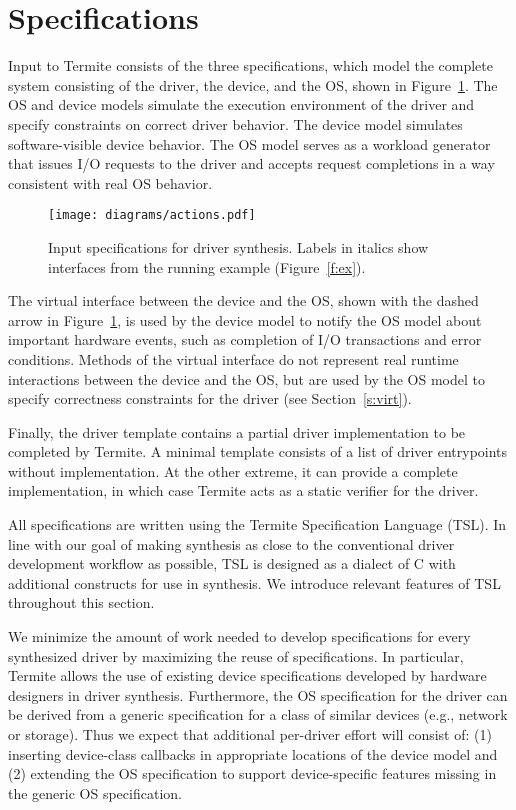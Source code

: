 \documentclass{book}
\newcommand{\termite}{Termite\xspace}
\newcommand{\tsl}{TSL\xspace}
\theoremstyle{definition}
\begin{document}
\section{Specifications}

\label{s:specifications}

Input to \termite consists of the three specifications, which model the complete system consisting of the driver, the device, and the OS, shown in Figure~\ref{f:actions}.  The OS and device models simulate the execution environment of the driver and specify constraints on correct driver behavior.  The device model simulates software-visible device behavior.  The OS model serves as a workload generator that issues I/O requests to the driver and accepts request completions in a way consistent with real OS behavior.

\begin{figure}
    \center
    \texttt{[image: diagrams/actions.pdf]}
    \caption{Input specifications for driver synthesis.  
    Labels in italics show interfaces from the running example
    (Figure~\ref{f:ex}).}\label{f:actions}
\end{figure}

The virtual interface between the device and the OS, shown with the dashed arrow in Figure~\ref{f:actions}, is used by the device model to notify the OS model about important hardware events, such as completion of I/O transactions and error conditions.  Methods of the virtual interface do not represent real runtime interactions between the device and the OS, but are used by the OS model to specify correctness constraints for the driver (see Section~\ref{s:virt}).

Finally, the driver template contains a partial driver implementation to be completed by \termite.  A minimal template consists of a list of driver entrypoints without implementation.  At the other extreme, it can provide a complete implementation, in which case \termite acts as a static verifier for the driver.

All specifications are written using the \termite Specification Language (\tsl).  In line with our goal of making synthesis as close to the conventional driver development workflow as possible, \tsl is designed as a dialect of C with additional constructs for use in synthesis.  We introduce relevant features of \tsl throughout this section.

We minimize the amount of work needed to develop specifications for every synthesized driver by maximizing the reuse of specifications.  In particular, \termite allows the use of existing device specifications developed by hardware designers in driver synthesis.  Furthermore, the OS specification for the driver can be derived from a generic specification for a class of similar devices (e.g., network or storage).  Thus we expect that additional per-driver effort will consist of: (1) inserting device-class callbacks in appropriate locations of the device model and (2) extending the OS specification to support device-specific features missing in the  generic OS specification.
\end{document}
